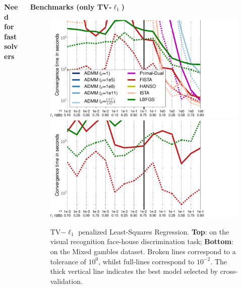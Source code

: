 \documentclass[french]{STIC_poster}
\begin{document}
\begin{frame}[t]
\begin{columns}[t]
\begin{column}{.48\linewidth}
\begin{nbox}[\textwidth]{\textbf{Need for fast solvers}}
                                  \end{nbox}
			\end{column}
			\hfill
			\begin{column}{.48\linewidth}
			  \begin{nbox}[\textwidth]{\textbf{Benchmarks (only TV-$\ell_1$)}}                          
                            \begin{figure}
                              \includegraphics[width=1.2\linewidth]{bench/haxby_mse.pdf}%
                              \hspace{-.09\linewidth}%
                              \includegraphics[width=1.2\linewidth]{bench/poldrack_mse.pdf}
                              \caption{TV$-\ell_1$ penalized Least-Squares Regression. \textbf{Top}:
                                on the visual recognition  face-house discrimination task; \textbf{Bottom}: on the
                                Mixed gambles dataset. Broken lines correspond to a tolerance of $10^{0}$,
                                whilst full-lines correspond to $10^{-2}$. The thick vertical line
                                indicates the best model selected by cross-validation.}
                              \label{Fig:MSEtimes}

\end{figure}
\end{nbox}
\end{column}
\end{columns}
\end{frame}
\end{document}
